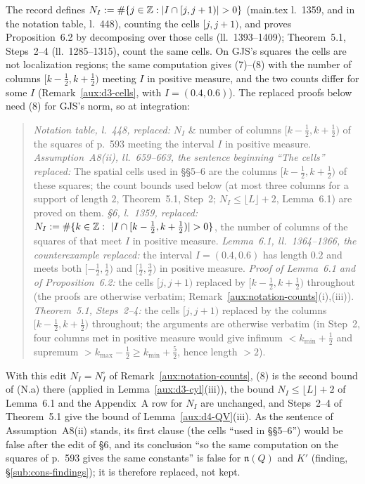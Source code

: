 The record defines $N_I:=\#\{j\in\Z:|I\cap[j,j+1)|>0\}$ (main.tex l.~1359, and in the notation
table, l.~448), counting the cells $[j,j+1)$, and proves Proposition~6.2 by decomposing over those
cells (ll.~1393--1409); Theorem~5.1, Steps~2--4 (ll.~1285--1315), count the same cells.  On GJS's
squares the cells are not localization regions; the same computation gives (7)--(8) with the
number of columns $[k-\frac12,k+\frac12)$ meeting $I$ in positive measure, and the two counts
differ for some $I$ (Remark~\ref{aux:d3-cells}, with $I=(0.4,0.6)$).  The replaced proofs below
need (8) for GJS's norm, so at integration:
\begin{quote}\small
\emph{Notation table, l.~448, replaced:} $N_I$ \& number of columns $[k-\frac12,k+\frac12)$ of the
squares of p.~593 meeting the interval $I$ in positive measure.
\emph{Assumption~A8(ii), ll.~659--663, the sentence beginning ``The cells'' replaced:} The spatial
cells used in \S\S5--6 are the columns $[k-\frac12,k+\frac12)$ of these squares; the count bounds
used below (at most three columns for a support of length $2$, Theorem~5.1, Step~2;
$N_I\le\lfloor L\rfloor+2$, Lemma~6.1) are proved on them.
\emph{\S6, l.~1359, replaced:} $N_I:=\#\{k\in\Z:\ |I\cap[k-\tfrac12,k+\tfrac12)|>0\}$, the number
of columns of the squares of \cite[p.~593]{GJS} that meet $I$ in positive measure.
\emph{Lemma~6.1, ll.~1364--1366, the counterexample replaced:} the interval $I=(0.4,0.6)$ has
length $0.2$ and meets both $[-\frac12,\frac12)$ and $[\frac12,\frac32)$ in positive measure.
\emph{Proof of Lemma~6.1 and of Proposition~6.2:} the cells $[j,j+1)$ replaced by
$[k-\frac12,k+\frac12)$ throughout (the proofs are otherwise verbatim;
Remark~\ref{aux:notation-counts}(i),(iii)).
\emph{Theorem~5.1, Steps~2--4:} the cells $[j,j+1)$ replaced by the columns
$[k-\frac12,k+\frac12)$ throughout; the arguments are otherwise verbatim (in Step~2, four columns
met in positive measure would give infimum $<k_{\min}+\frac12$ and supremum
$>k_{\max}-\frac12\ge k_{\min}+\frac52$, hence length $>2$).
\end{quote}
With this edit $N_I=N^\square_I$ of Remark~\ref{aux:notation-counts}, (8) is the second bound of
(N.a) there (applied in Lemma~\ref{aux:d3-cyl}(iii)), the bound $N_I\le\lfloor L\rfloor+2$ of
Lemma~6.1 and the Appendix~A row for $N_I$ are unchanged, and Steps~2--4 of Theorem~5.1 give the
bound of Lemma~\ref{aux:d4-QV}(iii).  As the sentence of Assumption~A8(ii) stands, its first
clause (the cells ``used in \S\S5--6'') would be false after the edit of \S6, and its conclusion
``so the same computation on the squares of p.~593 gives the same constants'' is false for
$\mathfrak n(Q)$ and $K'$ (finding, \S\ref{sub:cons-findings}); it is therefore replaced, not kept.

